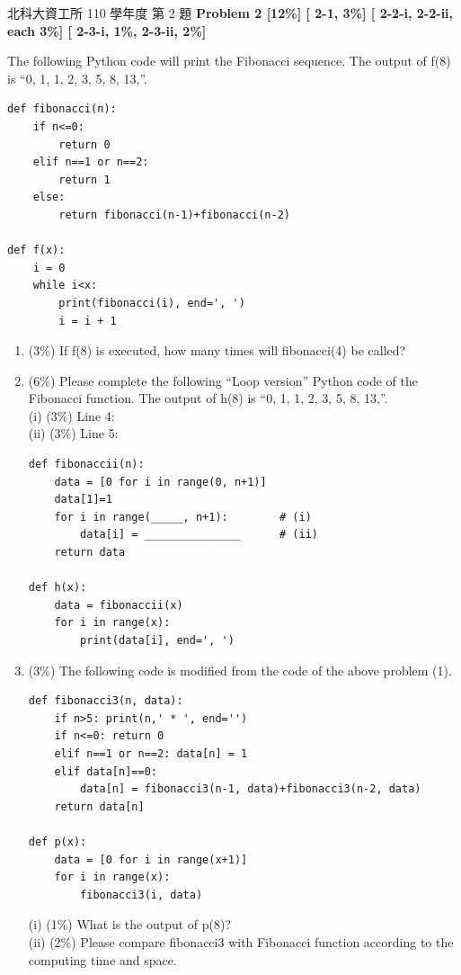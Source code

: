 \begin{pastexam}[label={px:dp-1}]{北科大資工所 110 學年度 第 2 題}
\textbf{Problem 2 [12\%] [ 2-1, 3\%] [ 2-2-i, 2-2-ii, each 3\%] [ 2-3-i, 1\%, 2-3-ii, 2\%]}

The following Python code will print the Fibonacci sequence. The output of f(8) is ``0, 1, 1, 2, 3, 5, 8, 13,''.
\begin{verbatim}
def fibonacci(n):
    if n<=0:
        return 0
    elif n==1 or n==2:
        return 1
    else:
        return fibonacci(n-1)+fibonacci(n-2)

def f(x):
    i = 0
    while i<x:
        print(fibonacci(i), end=', ')
        i = i + 1
\end{verbatim}
\begin{enumerate}[label=(\arabic*)]
\item (3\%) If f(8) is executed, how many times will fibonacci(4) be called?
\item (6\%) Please complete the following ``Loop version'' Python code of the Fibonacci function. The output of h(8) is ``0, 1, 1, 2, 3, 5, 8, 13,''.\\
(i) (3\%) Line 4: \underline{\hspace{4em}}\\
(ii) (3\%) Line 5: \underline{\hspace{4em}}
\begin{verbatim}
def fibonaccii(n):
    data = [0 for i in range(0, n+1)]
    data[1]=1
    for i in range(_____, n+1):        # (i)
        data[i] = _______________      # (ii)
    return data

def h(x):
    data = fibonaccii(x)
    for i in range(x):
        print(data[i], end=', ')
\end{verbatim}
\item (3\%) The following code is modified from the code of the above problem (1).
\begin{verbatim}
def fibonacci3(n, data):
    if n>5: print(n,' * ', end='')
    if n<=0: return 0
    elif n==1 or n==2: data[n] = 1
    elif data[n]==0:
        data[n] = fibonacci3(n-1, data)+fibonacci3(n-2, data)
    return data[n]

def p(x):
    data = [0 for i in range(x+1)]
    for i in range(x):
        fibonacci3(i, data)
\end{verbatim}
(i) (1\%) What is the output of p(8)?\\
(ii) (2\%) Please compare fibonacci3 with Fibonacci function according to the computing time and space.
\end{enumerate}
\end{pastexam}

